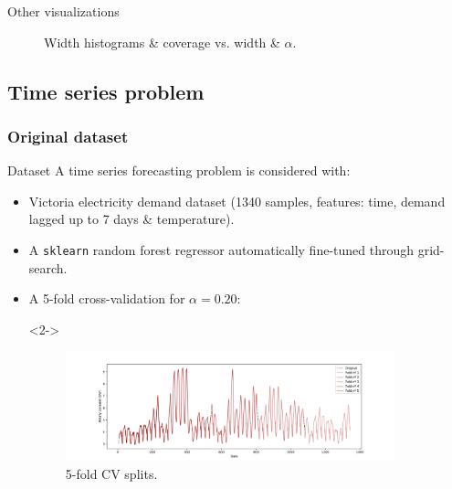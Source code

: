 \documentclass{beamer}
\renewcommand{\a}{\alpha}
\begin{document}
\begin{frame}{Other visualizations}
\begin{figure}[ht]
\begin{subfigure}[b]{0.32\textwidth}
        \end{subfigure}
        \caption{Width histograms \& coverage vs. width \& $\a$.}
    \end{figure}
\end{frame}


\subsection{Time series problem}


\subsubsection{Original dataset}


\begin{frame}{Dataset}
        A time series forecasting problem is considered with:
        \begin{itemize}%
            \item Victoria electricity demand dataset (1340 samples, features: time, demand lagged up to 7 days \& temperature).
            \item A \texttt{sklearn} random forest regressor automatically fine-tuned through grid-search.
            \item A 5-fold cross-validation for $\a=0.20$: %
            \item[]<2->
            \begin{figure}
                \includegraphics[width=0.9\textwidth]{Figures/timeseries/without-change-point/ts-5-folds.png}
                \vspace{-2mm}
                \caption{5-fold CV splits.}
            \end{figure}
        \end{itemize}
\end{frame}
\end{document}
